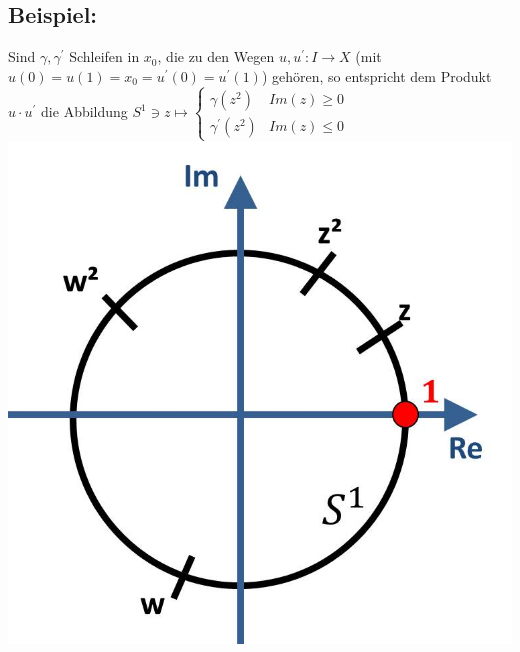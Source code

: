\documentclass[a4paper,11pt,notitlepage]{report}
\newenvironment{bsp}[1]
{
\setlength{\fboxsep}{10pt}
\subsection*{Beispiel: #1}
\begin{upshape}
}
{
\end{upshape}
}
\begin{document}
\begin{bsp}{}
	Sind $\gamma, \gamma^\prime$ Schleifen in $x_0$, die zu den Wegen $u,u^\prime \colon I \rightarrow X$ (mit $u(0)=u(1)=x_0=u^\prime(0)=u^\prime(1)$) gehören, so entspricht dem Produkt $u \cdot u^\prime$ die Abbildung $S^1 \ni z \mapsto \begin{cases} \gamma(z^2) & Im(z) \geq 0 \\ \gamma^\prime(z^2) & Im(z) \leq 0 \end{cases}$ \newline
	\newline \includegraphics[scale=0.4]{images/Produkt_auf_S1.jpg}
\end{bsp}
\end{document}
